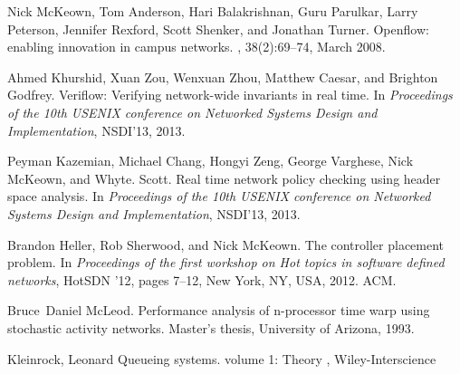 \documentclass[conference]{IEEEtran}
\begin{document}
%
%
%
\begin{thebibliography}{1}

Nick McKeown, Tom Anderson, Hari Balakrishnan, Guru Parulkar, Larry Peterson,
  Jennifer Rexford, Scott Shenker, and Jonathan Turner.
\newblock Openflow: enabling innovation in campus networks.
, 38(2):69--74, March 2008.


Ahmed Khurshid, Xuan Zou, Wenxuan Zhou, Matthew Caesar, and Brighton Godfrey.
\newblock Veriflow: Verifying network-wide invariants in real time.
\newblock In {\em Proceedings of the 10th USENIX conference on Networked
  Systems Design and Implementation}, NSDI'13, 2013.


Peyman Kazemian, Michael Chang, Hongyi Zeng, George Varghese, Nick McKeown, and
  Whyte. Scott.
\newblock Real time network policy checking using header space analysis.
\newblock In {\em Proceedings of the 10th USENIX conference on Networked
  Systems Design and Implementation}, NSDI'13, 2013.
  

Brandon Heller, Rob Sherwood, and Nick McKeown.
\newblock The controller placement problem.
\newblock In {\em Proceedings of the first workshop on Hot topics in software
  defined networks}, HotSDN '12, pages 7--12, New York, NY, USA, 2012. ACM.
  

Bruce~Daniel McLeod.
\newblock Performance analysis of n-processor time warp using stochastic
  activity networks.
\newblock Master's thesis, University of Arizona, 1993.
  

Kleinrock, Leonard
\newblock Queueing systems. volume 1: Theory
, Wiley-Interscience
 
  
\end{thebibliography}






\end{document}
